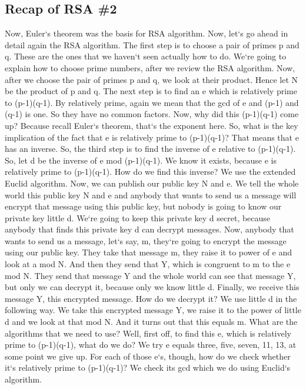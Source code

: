 \subsection{Recap of RSA \#2}
Now, Euler`s theorem was the basis for RSA algorithm.
Now, let`s go ahead in detail again the RSA algorithm.
The first step is to choose a pair of primes p and q.
These are the ones that we haven`t seen actually how to do.
We`re going to explain how to choose prime numbers, after we review the RSA algorithm.
Now, after we choose the pair of primes p and q, we look at their product.
Hence let N be the product of p and q.
The next step is to find an e which is relatively prime to (p-1)(q-1).
By relatively prime, again we mean that the gcd of e and (p-1) and (q-1) is one.
So they have no common factors.
Now, why did this (p-1)(q-1) come up? Because recall Euler`s theorem, that`s the exponent here.
So, what is the key implication of the fact that e is relatively prime to (p-1)(q-1)? That means that e has an inverse.
So, the third step is to find the inverse of e relative to (p-1)(q-1).
So, let d be the inverse of e mod (p-1)(q-1).
We know it exists, because e is relatively prime to (p-1)(q-1).
How do we find this inverse? We use the extended Euclid algorithm.
Now, we can publish our public key N and e.
We tell the whole world this public key N and e and anybody that wants to send us a message will encrypt that message using this public key, but nobody is going to know our private key little d.
We`re going to keep this private key d secret, because anybody that finds this private key d can decrypt messages.
Now, anybody that wants to send us a message, let`s say, m, they`re going to encrypt the message using our public key.
They take that message m, they raise it to power of e and look at a mod N\@.
And then they send that Y, which is congruent to m to the e mod N\@.
They send that message Y and the whole world can see that message Y, but only we can decrypt it, because only we know little d.
Finally, we receive this message Y, this encrypted message.
How do we decrypt it? We use little d in the following way.
We take this encrypted message Y, we raise it to the power of little d and we look at that mod N\@.
And it turns out that this equals m.
What are the algorithms that we need to use? Well, first off, to find this e, which is relatively prime to (p-1)(q-1), what do we do? We try e equals three, five, seven, 11, 13, at some point we give up.
For each of those e`s, though, how do we check whether it`s relatively prime to (p-1)(q-1)? We check its gcd which we do using Euclid`s algorithm.
